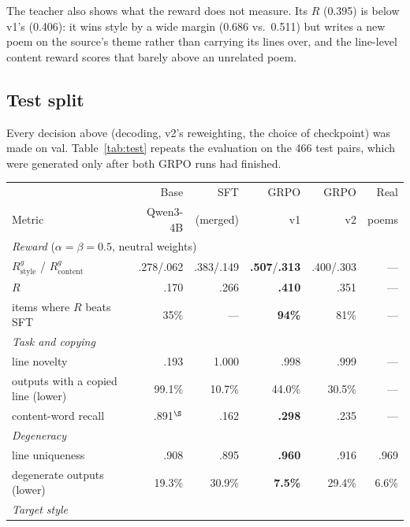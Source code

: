 \documentclass[11pt]{article}
\begin{document}
The teacher also shows what the reward does not measure. Its $R$ (0.395) is
below v1's (0.406): it wins style by a wide margin (0.686 vs.\ 0.511) but
writes a new poem on the source's theme rather than carrying its lines over,
and the line-level content reward scores that barely above an unrelated poem.

\subsection{Test split}\label{sec:test}

Every decision above (decoding, v2's reweighting, the choice of checkpoint)
was made on val. Table~\ref{tab:test} repeats the evaluation on the 466 test
pairs, which were generated only after both GRPO runs had finished.

\begin{table}[ht]
\centering\small
\begin{tabular}{lrrrrr}
\toprule
& Base & SFT & GRPO & GRPO & Real \\
Metric & Qwen3-4B & (merged) & v1 & v2 & poems \\
\midrule
\multicolumn{6}{l}{\emph{Reward} ($\alpha=\beta=0.5$, neutral weights)} \\
\quad $R^{g}_{\mathrm{style}}$ / $R^{g}_{\mathrm{content}}$ & .278/.062 & .383/.149 & \textbf{.507}/\textbf{.313} & .400/.303 & --- \\
\quad $R$                                   & .170 & .266 & \textbf{.410} & .351 & --- \\
\quad items where $R$ beats SFT             & 35\% & --- & \textbf{94\%} & 81\% & --- \\
\midrule
\multicolumn{6}{l}{\emph{Task and copying}} \\
\quad line novelty                          & .193 & 1.000 & .998 & .999 & --- \\
\quad outputs with a copied line (lower)    & 99.1\% & 10.7\% & 44.0\% & 30.5\% & --- \\
\quad content-word recall                   & .891$^\S$ & .162 & \textbf{.298} & .235 & --- \\
\midrule
\multicolumn{6}{l}{\emph{Degeneracy}} \\
\quad line uniqueness                       & .908 & .895 & \textbf{.960} & .916 & .969 \\
\quad degenerate outputs (lower)            & 19.3\% & 30.9\% & \textbf{7.5\%} & 29.4\% & 6.6\% \\
\midrule
\multicolumn{6}{l}{\emph{Target style}} \\

\end{tabular}
\end{table}
\end{document}
